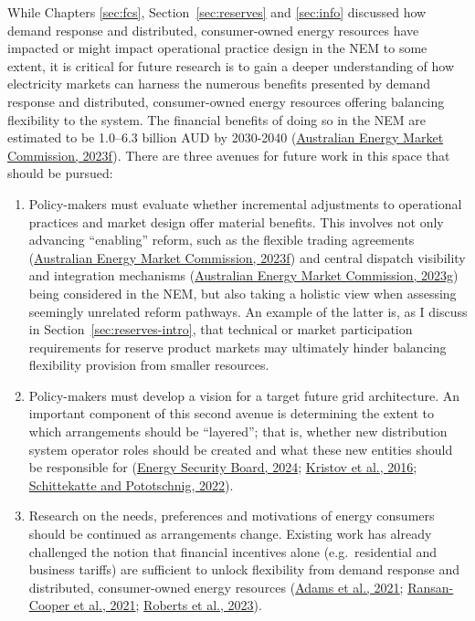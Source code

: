\documentclass[12pt,a4paper,]{report}
\begin{document}
While Chapters \ref{sec:fcs}, Section~\ref{sec:reserves} and
\ref{sec:info} discussed how demand response and distributed,
consumer-owned energy resources have impacted or might impact
operational practice design in the NEM to some extent, it is critical
for future research is to gain a deeper understanding of how electricity
markets can harness the numerous benefits presented by demand response
and distributed, consumer-owned energy resources offering balancing
flexibility to the system. The financial benefits of doing so in the NEM
are estimated to be 1.0--6.3 billion AUD by 2030-2040
(\protect\hyperlink{ref-australianenergymarketcommissionUnlockingCERBenefits2023}{Australian
Energy Market Commission, 2023f}). There are three avenues for future
work in this space that should be pursued:

\begin{enumerate}
\def\labelenumi{\arabic{enumi}.}
\item
  Policy-makers must evaluate whether incremental adjustments to
  operational practices and market design offer material benefits. This
  involves not only advancing ``enabling'' reform, such as the flexible
  trading agreements
  (\protect\hyperlink{ref-australianenergymarketcommissionUnlockingCERBenefits2023}{Australian
  Energy Market Commission, 2023f}) and central dispatch visibility and
  integration mechanisms
  (\protect\hyperlink{ref-australianenergymarketcommissionIntegratingPriceresponsiveResources2023a}{Australian
  Energy Market Commission, 2023g}) being considered in the NEM, but
  also taking a holistic view when assessing seemingly unrelated reform
  pathways. An example of the latter is, as I discuss in
  Section~\ref{sec:reserves-intro}, that technical or market
  participation requirements for reserve product markets may ultimately
  hinder balancing flexibility provision from smaller resources.
\item
  Policy-makers must develop a vision for a target future grid
  architecture. An important component of this second avenue is
  determining the extent to which arrangements should be ``layered'';
  that is, whether new distribution system operator roles should be
  created and what these new entities should be responsible for
  (\protect\hyperlink{ref-energysecurityboardConsumerEnergyResources2024}{Energy
  Security Board, 2024};
  \protect\hyperlink{ref-kristovTaleTwoVisions2016}{Kristov et al.,
  2016};
  \protect\hyperlink{ref-schittekatteDistributedEnergyResources2022}{Schittekatte
  and Pototschnig, 2022}).
\item
  Research on the needs, preferences and motivations of energy consumers
  should be continued as arrangements change. Existing work has already
  challenged the notion that financial incentives alone
  (e.g.~residential and business tariffs) are sufficient to unlock
  flexibility from demand response and distributed, consumer-owned
  energy resources
  (\protect\hyperlink{ref-adamsSocialLicenseAutomate2021}{Adams et al.,
  2021};
  \protect\hyperlink{ref-ransan-cooperApplyingResponsibleAlgorithm2021}{Ransan-Cooper
  et al., 2021};
  \protect\hyperlink{ref-robertsSocialLicenseAutomate2023}{Roberts et
  al., 2023}).
\end{enumerate}
\end{document}
